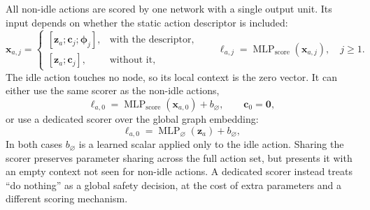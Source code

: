 All non-idle actions are scored by one network with a single output unit. Its
input depends on whether the static action descriptor is included:
\begin{equation}
  \mathbf{x}_{a,j} =
  \begin{cases}
    [\mathbf{z}_a;\mathbf{c}_j;\boldsymbol{\phi}_j],
      & \text{with the descriptor},\\
    [\mathbf{z}_a;\mathbf{c}_j],
      & \text{without it},
  \end{cases}
  \qquad
  \ell_{a,j}=\operatorname{MLP}_{\mathrm{score}}(\mathbf{x}_{a,j}),
  \quad j\geq 1.
  \label{eq:candidate-shared-scorer}
\end{equation}
The idle action touches no node, so its local context is the zero vector. It can
either use the same scorer as the non-idle actions,
\begin{equation}
  \ell_{a,0} =
  \operatorname{MLP}_{\mathrm{score}}(\mathbf{x}_{a,0}) + b_{\varnothing},
  \qquad \mathbf{c}_0=\mathbf{0},
  \label{eq:candidate-shared-do-nothing}
\end{equation}
or use a dedicated scorer over the global graph embedding:
\begin{equation}
  \ell_{a,0} =
  \operatorname{MLP}_{\varnothing}(\mathbf{z}_a) + b_{\varnothing},
  \label{eq:candidate-do-nothing-head}
\end{equation}
In both cases $b_{\varnothing}$ is a learned scalar applied only to the idle
action. Sharing the scorer preserves parameter sharing across the full action
set, but presents it with an empty context not seen for non-idle actions. A
dedicated scorer instead treats ``do nothing'' as a global safety decision, at
the cost of extra parameters and a different scoring mechanism.

